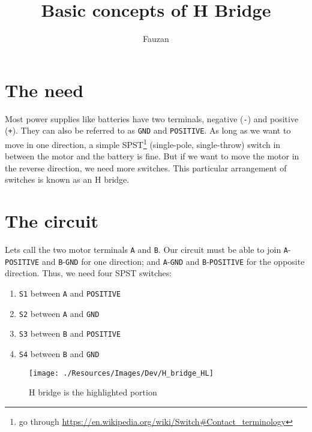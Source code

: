 \documentclass{article}
\title{Basic concepts of H Bridge}
\author{Fauzan}
\begin{document}
\newcommand{\inlncd}[1]{\colorbox{lgray}{\texttt{#1}}}

\maketitle



\section{The need}

	Most power supplies like batteries have two terminals, negative (\texttt{-}) and positive (\texttt{+}). They can also be referred to as \texttt{GND} and \texttt{POSITIVE}. As long as we want to move in one direction, a simple SPST\footnote{go through \url{https://en.wikipedia.org/wiki/Switch\#Contact\_terminology}} (single-pole, single-throw) switch in between the motor and the battery is fine. But if we want to move the motor in the reverse direction, we need more switches. This particular arrangement of switches is known as an H bridge.

\section{The circuit}

	Lets call the two motor terminals \texttt{A} and \texttt{B}. Our circuit must be able to join \texttt{A}-\texttt{POSITIVE} and \texttt{B}-\texttt{GND} for one direction; and \texttt{A}-\texttt{GND} and \texttt{B}-\texttt{POSITIVE} for the opposite direction. Thus, we need four SPST switches:

	\begin{enumerate}

		\item \texttt{S1} between \texttt{A} and \texttt{POSITIVE}
		\item \texttt{S2} between \texttt{A} and \texttt{GND}
		\item \texttt{S3} between \texttt{B} and \texttt{POSITIVE}
		\item \texttt{S4} between \texttt{B} and \texttt{GND}

	\end{enumerate}


	\begin{figure}[h]
		\centering
			\texttt{[image: ./Resources/Images/Dev/H\_bridge\_HL]}
		\caption{H bridge is the highlighted portion}
	\end{figure}
\end{document}
